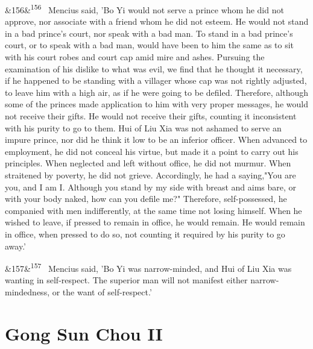 \documentclass[12pt]{article}
\newcommand{\para}[1][]{\par\noindent\ifx&#1&\else\textsuperscript{\footnotesize #1}~\fi}
\begin{document}
\para[156] Mencius said, 'Bo Yi would not serve a prince whom he did not approve, nor associate with a friend whom he did not esteem. He would not stand in a bad prince's court, nor speak with a bad man. To stand in a bad prince's court, or to speak with a bad man, would have been to him the same as to sit with his court robes and court cap amid mire and ashes. Pursuing the examination of his dislike to what was evil, we find that he thought it necessary, if he happened to be standing with a villager whose cap was not rightly adjusted, to leave him with a high air, as if he were going to be defiled. Therefore, although some of the princes made application to him with very proper messages, he would not receive their gifts. He would not receive their gifts, counting it inconsistent with his purity to go to them. Hui of Liu Xia was not ashamed to serve an impure prince, nor did he think it low to be an inferior officer. When advanced to employment, he did not conceal his virtue, but made it a point to carry out his principles. When neglected and left without office, he did not murmur. When straitened by poverty, he did not grieve. Accordingly, he had a saying,"You are you, and I am I. Although you stand by my side with breast and aims bare, or with your body naked, how can you defile me?" Therefore, self-possessed, he companied with men indifferently, at the same time not losing himself. When he wished to leave, if pressed to remain in office, he would remain. He would remain in office, when pressed to do so, not counting it required by his purity to go away.'

\para[157] Mencius said, 'Bo Yi was narrow-minded, and Hui of Liu Xia was wanting in self-respect. The superior man will not manifest either narrow-mindedness, or the want of self-respect.'

\section*{Gong Sun Chou II}
\end{document}
